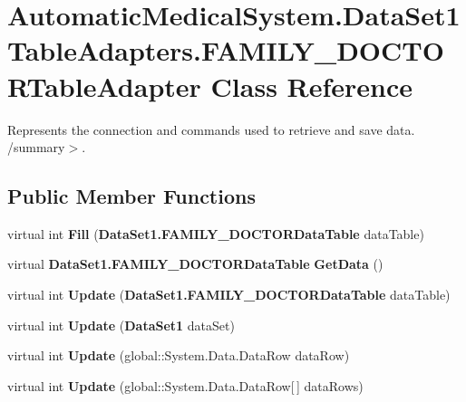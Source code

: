 \section{AutomaticMedicalSystem.DataSet1TableAdapters.FAMILY\_\-DOCTORTableAdapter Class Reference}
\label{class_automatic_medical_system_1_1_data_set1_table_adapters_1_1_f_a_m_i_l_y___d_o_c_t_o_r_table_adapter}
Represents the connection and commands used to retrieve and save data. /summary$>$.  


\subsection*{Public Member Functions}
\begin{CompactItemize}
\item 
virtual int \textbf{Fill} ({\bf DataSet1.FAMILY\_\-DOCTORDataTable} dataTable)\label{class_automatic_medical_system_1_1_data_set1_table_adapters_1_1_f_a_m_i_l_y___d_o_c_t_o_r_table_adapter_3f8d10ef762802c38232b08160e5db2d}

\item 
virtual {\bf DataSet1.FAMILY\_\-DOCTORDataTable} \textbf{GetData} ()\label{class_automatic_medical_system_1_1_data_set1_table_adapters_1_1_f_a_m_i_l_y___d_o_c_t_o_r_table_adapter_dd05f06f10b84bb22d5bac6d65960672}

\item 
virtual int \textbf{Update} ({\bf DataSet1.FAMILY\_\-DOCTORDataTable} dataTable)\label{class_automatic_medical_system_1_1_data_set1_table_adapters_1_1_f_a_m_i_l_y___d_o_c_t_o_r_table_adapter_35dcc84707db76d8ab298d1f4c7decc6}

\item 
virtual int \textbf{Update} ({\bf DataSet1} dataSet)\label{class_automatic_medical_system_1_1_data_set1_table_adapters_1_1_f_a_m_i_l_y___d_o_c_t_o_r_table_adapter_d148090572b1d30202b2b7dcea59b161}

\item 
virtual int \textbf{Update} (global::System.Data.DataRow dataRow)\label{class_automatic_medical_system_1_1_data_set1_table_adapters_1_1_f_a_m_i_l_y___d_o_c_t_o_r_table_adapter_42641207dac81af8551509dc5a661853}

\item 
virtual int \textbf{Update} (global::System.Data.DataRow[$\,$] dataRows)\label{class_automatic_medical_system_1_1_data_set1_table_adapters_1_1_f_a_m_i_l_y___d_o_c_t_o_r_table_adapter_73650ee86a61bd5ab5d1b829c63630c8}


\end{CompactItemize}
